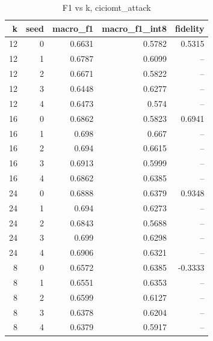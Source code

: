 \begin{table}
\caption{F1 vs k, ciciomt_attack}
\begin{tabular}{rrrrr}
\toprule
k & seed & macro_f1 & macro_f1_int8 & fidelity \\
\midrule
12 & 0 & 0.6631 & 0.5782 & 0.5315 \\
12 & 1 & 0.6787 & 0.6099 & -- \\
12 & 2 & 0.6671 & 0.5822 & -- \\
12 & 3 & 0.6448 & 0.6277 & -- \\
12 & 4 & 0.6473 & 0.574 & -- \\
16 & 0 & 0.6862 & 0.5823 & 0.6941 \\
16 & 1 & 0.698 & 0.667 & -- \\
16 & 2 & 0.694 & 0.6615 & -- \\
16 & 3 & 0.6913 & 0.5999 & -- \\
16 & 4 & 0.6862 & 0.6385 & -- \\
24 & 0 & 0.6888 & 0.6379 & 0.9348 \\
24 & 1 & 0.694 & 0.6273 & -- \\
24 & 2 & 0.6843 & 0.5688 & -- \\
24 & 3 & 0.699 & 0.6298 & -- \\
24 & 4 & 0.6906 & 0.6321 & -- \\
8 & 0 & 0.6572 & 0.6385 & -0.3333 \\
8 & 1 & 0.6551 & 0.6353 & -- \\
8 & 2 & 0.6599 & 0.6127 & -- \\
8 & 3 & 0.6378 & 0.6204 & -- \\
8 & 4 & 0.6379 & 0.5917 & -- \\
\bottomrule
\end{tabular}
\end{table}
